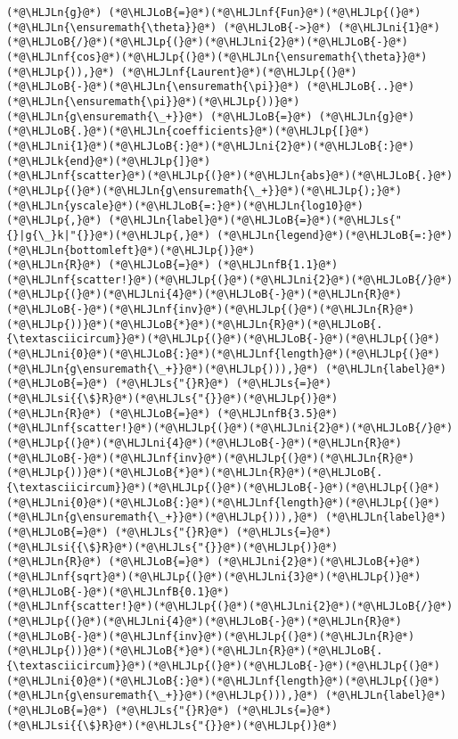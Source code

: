 \documentclass[12pt,a4paper]{article}
\newcommand{\HLJLk}[1]{\textcolor[RGB]{148,91,176}{\textbf{#1}}}
\newcommand{\HLJLn}[1]{#1}
\newcommand{\HLJLnf}[1]{\textcolor[RGB]{66,102,213}{#1}}
\newcommand{\HLJLs}[1]{\textcolor[RGB]{201,61,57}{#1}}
\newcommand{\HLJLsi}[1]{#1}
\newcommand{\HLJLnfB}[1]{\textcolor[RGB]{59,151,46}{#1}}
\newcommand{\HLJLni}[1]{\textcolor[RGB]{59,151,46}{#1}}
\newcommand{\HLJLoB}[1]{\textcolor[RGB]{102,102,102}{\textbf{#1}}}
\newcommand{\HLJLp}[1]{#1}
\begin{document}
\begin{lstlisting}
(*@\HLJLn{g}@*) (*@\HLJLoB{=}@*)(*@\HLJLnf{Fun}@*)(*@\HLJLp{(}@*)(*@\HLJLn{\ensuremath{\theta}}@*) (*@\HLJLoB{->}@*) (*@\HLJLni{1}@*)(*@\HLJLoB{/}@*)(*@\HLJLp{(}@*)(*@\HLJLni{2}@*)(*@\HLJLoB{-}@*)(*@\HLJLnf{cos}@*)(*@\HLJLp{(}@*)(*@\HLJLn{\ensuremath{\theta}}@*)(*@\HLJLp{)),}@*) (*@\HLJLnf{Laurent}@*)(*@\HLJLp{(}@*)(*@\HLJLoB{-}@*)(*@\HLJLn{\ensuremath{\pi}}@*) (*@\HLJLoB{..}@*) (*@\HLJLn{\ensuremath{\pi}}@*)(*@\HLJLp{))}@*)
(*@\HLJLn{g\ensuremath{\_+}}@*) (*@\HLJLoB{=}@*) (*@\HLJLn{g}@*)(*@\HLJLoB{.}@*)(*@\HLJLn{coefficients}@*)(*@\HLJLp{[}@*)(*@\HLJLni{1}@*)(*@\HLJLoB{:}@*)(*@\HLJLni{2}@*)(*@\HLJLoB{:}@*)(*@\HLJLk{end}@*)(*@\HLJLp{]}@*)
(*@\HLJLnf{scatter}@*)(*@\HLJLp{(}@*)(*@\HLJLn{abs}@*)(*@\HLJLoB{.}@*)(*@\HLJLp{(}@*)(*@\HLJLn{g\ensuremath{\_+}}@*)(*@\HLJLp{);}@*) (*@\HLJLn{yscale}@*)(*@\HLJLoB{=:}@*)(*@\HLJLn{log10}@*)(*@\HLJLp{,}@*) (*@\HLJLn{label}@*)(*@\HLJLoB{=}@*)(*@\HLJLs{"{}|g{\_}k|"{}}@*)(*@\HLJLp{,}@*) (*@\HLJLn{legend}@*)(*@\HLJLoB{=:}@*)(*@\HLJLn{bottomleft}@*)(*@\HLJLp{)}@*)
(*@\HLJLn{R}@*) (*@\HLJLoB{=}@*) (*@\HLJLnfB{1.1}@*)
(*@\HLJLnf{scatter!}@*)(*@\HLJLp{(}@*)(*@\HLJLni{2}@*)(*@\HLJLoB{/}@*)(*@\HLJLp{(}@*)(*@\HLJLni{4}@*)(*@\HLJLoB{-}@*)(*@\HLJLn{R}@*)(*@\HLJLoB{-}@*)(*@\HLJLnf{inv}@*)(*@\HLJLp{(}@*)(*@\HLJLn{R}@*)(*@\HLJLp{))}@*)(*@\HLJLoB{*}@*)(*@\HLJLn{R}@*)(*@\HLJLoB{.{\textasciicircum}}@*)(*@\HLJLp{(}@*)(*@\HLJLoB{-}@*)(*@\HLJLp{(}@*)(*@\HLJLni{0}@*)(*@\HLJLoB{:}@*)(*@\HLJLnf{length}@*)(*@\HLJLp{(}@*)(*@\HLJLn{g\ensuremath{\_+}}@*)(*@\HLJLp{))),}@*) (*@\HLJLn{label}@*) (*@\HLJLoB{=}@*) (*@\HLJLs{"{}R}@*) (*@\HLJLs{=}@*) (*@\HLJLsi{{\$}R}@*)(*@\HLJLs{"{}}@*)(*@\HLJLp{)}@*)
(*@\HLJLn{R}@*) (*@\HLJLoB{=}@*) (*@\HLJLnfB{3.5}@*)
(*@\HLJLnf{scatter!}@*)(*@\HLJLp{(}@*)(*@\HLJLni{2}@*)(*@\HLJLoB{/}@*)(*@\HLJLp{(}@*)(*@\HLJLni{4}@*)(*@\HLJLoB{-}@*)(*@\HLJLn{R}@*)(*@\HLJLoB{-}@*)(*@\HLJLnf{inv}@*)(*@\HLJLp{(}@*)(*@\HLJLn{R}@*)(*@\HLJLp{))}@*)(*@\HLJLoB{*}@*)(*@\HLJLn{R}@*)(*@\HLJLoB{.{\textasciicircum}}@*)(*@\HLJLp{(}@*)(*@\HLJLoB{-}@*)(*@\HLJLp{(}@*)(*@\HLJLni{0}@*)(*@\HLJLoB{:}@*)(*@\HLJLnf{length}@*)(*@\HLJLp{(}@*)(*@\HLJLn{g\ensuremath{\_+}}@*)(*@\HLJLp{))),}@*) (*@\HLJLn{label}@*) (*@\HLJLoB{=}@*) (*@\HLJLs{"{}R}@*) (*@\HLJLs{=}@*) (*@\HLJLsi{{\$}R}@*)(*@\HLJLs{"{}}@*)(*@\HLJLp{)}@*)
(*@\HLJLn{R}@*) (*@\HLJLoB{=}@*) (*@\HLJLni{2}@*)(*@\HLJLoB{+}@*)(*@\HLJLnf{sqrt}@*)(*@\HLJLp{(}@*)(*@\HLJLni{3}@*)(*@\HLJLp{)}@*)(*@\HLJLoB{-}@*)(*@\HLJLnfB{0.1}@*)
(*@\HLJLnf{scatter!}@*)(*@\HLJLp{(}@*)(*@\HLJLni{2}@*)(*@\HLJLoB{/}@*)(*@\HLJLp{(}@*)(*@\HLJLni{4}@*)(*@\HLJLoB{-}@*)(*@\HLJLn{R}@*)(*@\HLJLoB{-}@*)(*@\HLJLnf{inv}@*)(*@\HLJLp{(}@*)(*@\HLJLn{R}@*)(*@\HLJLp{))}@*)(*@\HLJLoB{*}@*)(*@\HLJLn{R}@*)(*@\HLJLoB{.{\textasciicircum}}@*)(*@\HLJLp{(}@*)(*@\HLJLoB{-}@*)(*@\HLJLp{(}@*)(*@\HLJLni{0}@*)(*@\HLJLoB{:}@*)(*@\HLJLnf{length}@*)(*@\HLJLp{(}@*)(*@\HLJLn{g\ensuremath{\_+}}@*)(*@\HLJLp{))),}@*) (*@\HLJLn{label}@*) (*@\HLJLoB{=}@*) (*@\HLJLs{"{}R}@*) (*@\HLJLs{=}@*) (*@\HLJLsi{{\$}R}@*)(*@\HLJLs{"{}}@*)(*@\HLJLp{)}@*)
\end{lstlisting}
\end{document}
